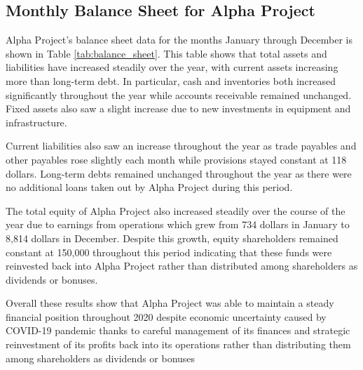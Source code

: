 

\subsection{Monthly Balance Sheet for Alpha Project}\label{sec:title}

Alpha Project's balance sheet data for the months January through December is shown in Table \ref{tab:balance_sheet}. This table shows that total assets and liabilities have increased steadily over the year, with current assets increasing more than long-term debt. In particular, cash and inventories both increased significantly throughout the year while accounts receivable remained unchanged. Fixed assets also saw a slight increase due to new investments in equipment and infrastructure. 

Current liabilities also saw an increase throughout the year as trade payables and other payables rose slightly each month while provisions stayed constant at 118 dollars. Long-term debts remained unchanged throughout the year as there were no additional loans taken out by Alpha Project during this period. 

The total equity of Alpha Project also increased steadily over the course of the year due to earnings from operations which grew from 734 dollars in January to 8,814 dollars in December. Despite this growth, equity shareholders remained constant at 150,000 throughout this period indicating that these funds were reinvested back into Alpha Project rather than distributed among shareholders as dividends or bonuses. 

Overall these results show that Alpha Project was able to maintain a steady financial position throughout 2020 despite economic uncertainty caused by COVID-19 pandemic thanks to careful management of its finances and strategic reinvestment of its profits back into its operations rather than distributing them among shareholders as dividends or bonuses